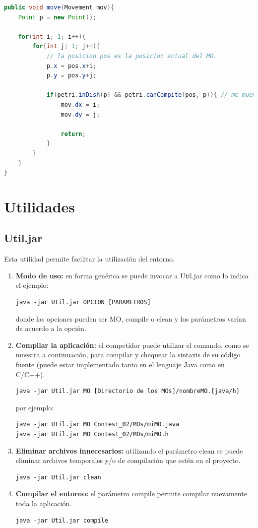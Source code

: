 \documentclass[11pt,a4paper]{article}
\begin{document}
\begin{lstlisting}[style=Code, language=Java]
public void move(Movement mov){
    Point p = new Point();

    for(int i; 1; i++){
        for(int j; 1; j++){
            // la posicion pos es la posicion actual del MO.
            p.x = pos.x+i;
            p.y = pos.y+j;

            if(petri.inDish(p) && petri.canCompite(pos, p)){ // me muevo a esa Posicion!!
                mov.dx = i;
                mov.dy = j;

                return;
            }
        }
    }
}
\end{lstlisting}

\section{Utilidades}

\subsection{Util.jar}
Esta utilidad permite facilitar la utilización del entorno.

\begin{enumerate}
\item {\bf Modo de uso: } en forma genérica se puede invocar a Util.jar como lo indica el ejemplo:
 \begin{lstlisting}[style=Code]
 java -jar Util.jar OPCION [PARAMETROS]
\end{lstlisting}
	donde las opciones pueden ser MO, compile o clean y los parámetros varían de acuerdo a la opción.
\item {\bf Compilar la aplicación:} el competidor puede utilizar el comando, como se muestra a continuación, para compilar y chequear la sintaxis de su código fuente (puede estar implementado tanto en el lenguaje Java como en C/C++). 
\begin{lstlisting}[style=Code]
java -jar Util.jar MO [Directorio de los MOs]/nombreMO.[java/h]
\end{lstlisting}
por ejemplo:
\begin{lstlisting}[style=Code]
java -jar Util.jar MO Contest_02/MOs/miMO.java
java -jar Util.jar MO Contest_02/MOs/miMO.h
\end{lstlisting}
\item {\bf Eliminar archivos innecesarios:} utilizando el parámetro clean se puede eliminar archivos temporales y/o de compilación que estén en el proyecto.
\begin{lstlisting}[style=Code]
java -jar Util.jar clean
\end{lstlisting}

\item {\bf Compilar el entorno: } el parámetro compile permite compilar nuevamente toda la aplicación.
\begin{lstlisting}[style=Code]
java -jar Util.jar compile
\end{lstlisting}

\end{enumerate}	 
\end{document}
